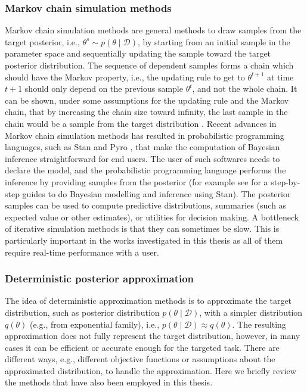 \documentclass[dissertation,math,vertlayout,pdfa,colorlinks]{aaltoseries}
\newcommand{\bD}{\mathcal{D}}
\begin{document}
\subsubsection{Markov chain simulation methods}

Markov chain simulation methods are general methods to draw samples from the target posterior, i.e., $\theta^s \sim p(\theta \mid \bD)$, by starting from an initial sample in the parameter space and sequentially updating the sample toward the target posterior distribution. The sequence of dependent samples forms a chain which should have the Markov property, i.e., the updating rule to get to $\theta^{t+1}$ at time $t+1$ should only depend on the previous sample $\theta^t$, and not the whole chain. It can be shown, under some assumptions for the updating rule and the Markov chain, that by increasing the chain size toward infinity, the last sample in the chain would be a sample from the target distribution \cite[Chapter~11]{Gelman2013}. Recent advances in Markov chain simulation methods has resulted in probabilistic programming languages, such as Stan \cite{STAN} and Pyro \cite{bingham2018pyro}, that make the computation of Bayesian inference straightforward for end users. The user of such softwares needs to declare the model, and the probabilistic programming language performs the inference by providing samples from the posterior (for example see \cite{Bayesian_workflow_cog_sci_2019} for a step-by-step guides to do Bayesian modelling and inference using Stan). The posterior samples can be used to compute predictive distributions, summaries (such as expected value or other estimates), or utilities for decision making. A bottleneck of iterative simulation methods is that they can sometimes be slow. This is particularly important in the works investigated in this thesis as all of them require real-time performance with a user.

\subsubsection{Deterministic posterior approximation}

The idea of deterministic approximation methods is to approximate the target distribution, such as posterior distribution $p(\theta \mid \bD)$, with a simpler distribution $q(\theta)$ (e.g., from exponential family), i.e., $p(\theta \mid \bD) \approx q(\theta)$. The resulting approximation does not fully represent the target distribution, however, in many cases it can be efficient or accurate enough for the targeted task. There are different ways, e.g., different objective functions or assumptions about the approximated distribution, to handle the approximation. Here we briefly review the methods that have also been employed in this thesis. 
\end{document}
